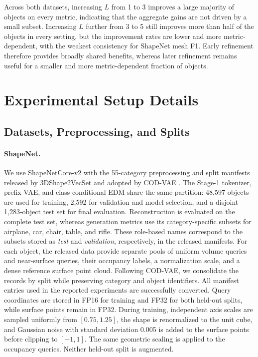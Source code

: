 Across both datasets, increasing $L$ from 1 to 3 improves a large majority of
objects on every metric, indicating that the aggregate gains are not driven by
a small subset. Increasing $L$ further from 3 to 5 still improves more than
half of the objects in every setting, but the improvement rates are lower and
more metric-dependent, with the weakest consistency for ShapeNet mesh F1.
Early refinement therefore provides broadly shared benefits, whereas later
refinement remains useful for a smaller and more metric-dependent fraction of
objects.

\section{Experimental Setup Details}
\label{sec:experimental-details}

\subsection{Datasets, Preprocessing, and Splits}

\paragraph{ShapeNet.}
We use ShapeNetCore-v2 \citep{chang2015shapenet} with the 55-category
preprocessing and split manifests released by 3DShape2VecSet
\citep{zhang20233dshape2vecset} and adopted by COD-VAE
\citep{cho2025representing}. The Stage-1 tokenizer, prefix VAE, and
class-conditional EDM share the same partition: 48,597 objects are used for
training, 2,592 for validation and model selection, and a disjoint 1,283-object
test set for final evaluation. Reconstruction is evaluated on the complete test
set, whereas generation metrics use its category-specific subsets for airplane,
car, chair, table, and rifle. These role-based names correspond to the subsets
stored as \emph{test} and \emph{validation}, respectively, in the released
manifests.
For each object, the released data provide separate pools of uniform volume
queries and near-surface queries, their occupancy labels, a normalization
scale, and a dense reference surface point cloud. Following COD-VAE, we
consolidate the records by split while preserving category and object
identifiers. All manifest entries used in the reported experiments are
successfully converted. Query
coordinates are stored in FP16 for training and FP32 for both held-out splits,
while surface points remain in FP32.
During training, independent axis scales are sampled uniformly from
$[0.75,1.25]$, the shape is renormalized to the unit cube, and Gaussian noise
with standard deviation 0.005 is added to the surface points before clipping
to $[-1,1]$.  The same geometric scaling is applied to the occupancy queries.
Neither held-out split is augmented.

